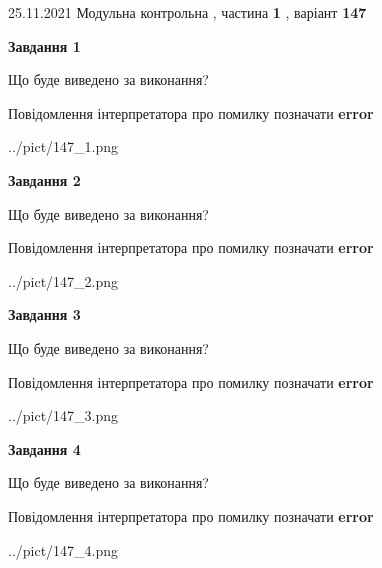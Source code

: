 \documentclass[10pt, ukrainian]{article}
\begin{document}
{25.11.2021 Модульна контрольна , частина \textbf { 1 }, варіант  \No \textbf { 147 }\par}
{
\begin {large}

{\begin {center}\textbf{Завдання 1}\end {center}}\par
Що буде виведено за виконання? \par
Повідомлення інтерпретатора про помилку позначати \textbf{error}

\begin{center}
	{../pict/147_1.png}
\end{center}
\newpage

{\begin {center}\textbf{Завдання 2}\end {center}}\par
Що буде виведено за виконання? \par
Повідомлення інтерпретатора про помилку позначати \textbf{error}

\begin{center}
	{../pict/147_2.png}
\end{center}
\newpage

{\begin {center}\textbf{Завдання 3}\end {center}}\par
Що буде виведено за виконання? \par
Повідомлення інтерпретатора про помилку позначати \textbf{error}

\begin{center}
	{../pict/147_3.png}
\end{center}
\newpage

{\begin {center}\textbf{Завдання 4}\end {center}}\par
Що буде виведено за виконання? \par
Повідомлення інтерпретатора про помилку позначати \textbf{error}

\begin{center}
	{../pict/147_4.png}
\end{center}
\newpage


\end{large}}
\end{document}
